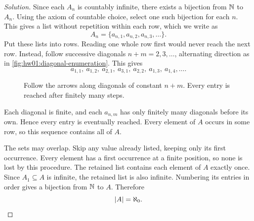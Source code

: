 
\begin{proof}[Solution]
Since each $A_n$ is countably infinite, there exists a bijection
from $\mathbb{N}$ to $A_n$. Using the axiom of countable choice, select
one such bijection for each $n$. This gives a list without
repetition within each row, which we write as
\[
  A_n=\{a_{n,1},a_{n,2},a_{n,3},\ldots\}.
\]
Put these lists into rows. Reading one whole row first would
never reach the next row. Instead, follow successive diagonals
$n+m=2,3,\ldots$, alternating direction as in
\autoref{fig:hw01:diagonal-enumeration}. This gives
\[
  a_{1,1},\ a_{1,2},\ a_{2,1},\ a_{3,1},
  \ a_{2,2},\ a_{1,3},\ a_{1,4},\ldots.
\]

\begin{figure}[h]
  \centering
  
  \caption[Enumerating a countable union.]{Follow the arrows along diagonals of constant $n+m$.
    Every entry is reached after finitely many steps.}
  \label{fig:hw01:diagonal-enumeration}
\end{figure}

Each diagonal is finite, and each $a_{n,m}$ has only finitely
many diagonals before its own. Hence every entry is eventually
reached. Every element of $A$ occurs in some row, so this sequence
contains all of $A$.

The sets may overlap. Skip any value already listed, keeping only
its first occurrence. Every element has a first occurrence at
a finite position, so none is lost by this procedure. The
retained list contains each element of $A$ exactly once.
Since $A_1\subseteq A$ is infinite, the retained list is also
infinite. Numbering its entries in order gives a bijection
from $\mathbb{N}$ to $A$. Therefore
\[
  |A|=\aleph_0.\qedhere
\]
\end{proof}
